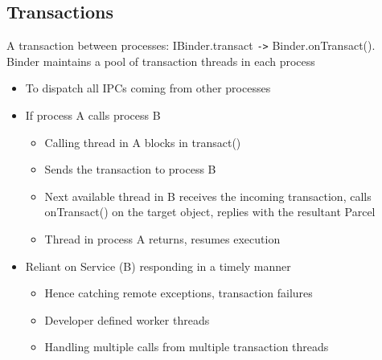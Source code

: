 \documentclass{article}
\begin{document}
\pagebreak

\subsection{Transactions}
A transaction between processes: IBinder.transact \verb|->| Binder.onTransact(). Binder maintains a pool of transaction threads in each process
\begin{itemize}
  \item To dispatch all IPCs coming from other processes
  \item If process A calls process B
  \begin{itemize}
    \item Calling thread in A blocks in transact()
    \item Sends the transaction to process B
    \item Next available thread in B receives the incoming transaction, calls onTransact() on the target object, replies with the resultant Parcel 
    \item Thread in process A returns, resumes execution
  \end{itemize}
  \item Reliant on Service (B) responding in a timely manner
  \begin{itemize}
    \item Hence catching remote exceptions, transaction failures
    \item Developer defined worker threads
    \item Handling multiple calls from multiple transaction threads
  \end{itemize}
\end{itemize}
\end{document}
